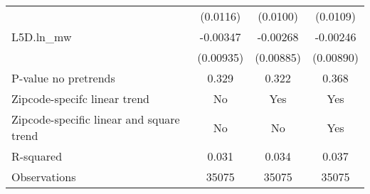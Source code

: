 {\begin{tabular}{l*{3}{c}}
          & (0.0116)         & (0.0100)         & (0.0109)         \\
[1em]
L5D.ln\_mw & -0.00347         & -0.00268         & -0.00246         \\
          &(0.00935)         &(0.00885)         &(0.00890)         \\
\hline
P-value no pretrends&    0.329         &    0.322         &    0.368         \\
Zipcode-specifc linear trend&       No         &      Yes         &      Yes         \\
Zipcode-specific linear and square trend&       No         &       No         &      Yes         \\
R-squared &    0.031         &    0.034         &    0.037         \\
Observations&    35075         &    35075         &    35075         \\
\hline\hline
\end{tabular}
}
